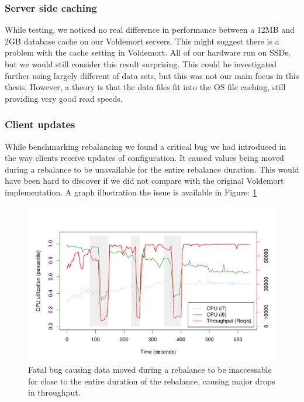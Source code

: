 \subsubsection{Server side caching}
While testing, we noticed no real difference in performance between a 12MB and 2GB database cache on our Voldemort servers. This might suggest there is a problem with the cache setting in Voldemort. All of our hardware run on SSDs, but we would still consider this result surprising. This could be investigated further using largely different of data sets, but this was not our main focus in this thesis. However, a theory is that the data files fit into the OS file caching, still providing very good read speeds.

\subsubsection{Client updates}
While benchmarking rebalancing we found a critical bug we had introduced in the way clients receive updates of configuration. It caused values being moved during a rebalance to be unavailable for the entire rebalance duration. This would have been hard to discover if we did not compare with the original Voldemort implementation. A graph illustration the issue is available in Figure: \ref{fig:adaptive_bug}

\begin{figure}[h]
    \centering
    \includegraphics[width=1.0\textwidth]{results/throughput/adaptive/zookeeper/auto_2nodes_error}
    \caption{Fatal bug causing data moved during a rebalance to be inaccessable for close to the entire duration of the rebalance, causing major drops in throughput.}
    \label{fig:adaptive_bug}
\end{figure}

